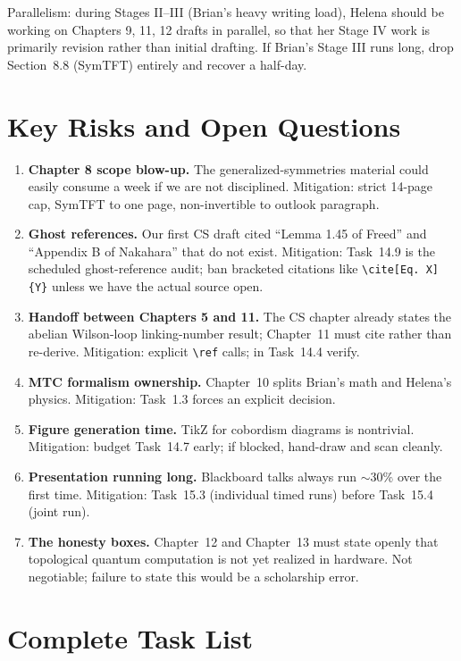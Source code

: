 \documentclass[11pt]{article}
\begin{document}
\noindent Parallelism: during Stages II--III (Brian's heavy writing load), Helena should
be working on Chapters 9, 11, 12 drafts in parallel, so that her Stage IV work is
primarily revision rather than initial drafting. If Brian's Stage III runs long, drop
Section~8.8 (SymTFT) entirely and recover a half-day.

\section{Key Risks and Open Questions}\label{sec:risks}

\begin{enumerate}[leftmargin=2em]
\item \textbf{Chapter 8 scope blow-up.} The generalized-symmetries material could easily
consume a week if we are not disciplined. Mitigation: strict 14-page cap, SymTFT to one
page, non-invertible to outlook paragraph.
\item \textbf{Ghost references.} Our first CS draft cited ``Lemma 1.45 of Freed'' and
``Appendix B of Nakahara'' that do not exist. Mitigation: Task~14.9 is the scheduled
ghost-reference audit; ban bracketed citations like \texttt{\textbackslash cite[Eq.~X]\{Y\}}
unless we have the actual source open.
\item \textbf{Handoff between Chapters 5 and 11.} The CS chapter already states the
abelian Wilson-loop linking-number result; Chapter~11 must cite rather than re-derive.
Mitigation: explicit \texttt{\textbackslash ref} calls; in Task~14.4 verify.
\item \textbf{MTC formalism ownership.} Chapter~10 splits Brian's math and Helena's
physics. Mitigation: Task~1.3 forces an explicit decision.
\item \textbf{Figure generation time.} TikZ for cobordism diagrams is nontrivial.
Mitigation: budget Task~14.7 early; if blocked, hand-draw and scan cleanly.
\item \textbf{Presentation running long.} Blackboard talks always run $\sim 30\%$ over
the first time. Mitigation: Task~15.3 (individual timed runs) before Task~15.4 (joint run).
\item \textbf{The honesty boxes.} Chapter~12 and Chapter~13 must state openly that
topological quantum computation is not yet realized in hardware. Not negotiable; failure
to state this would be a scholarship error.
\end{enumerate}

\section{Complete Task List}\label{sec:tasks}
\end{document}
